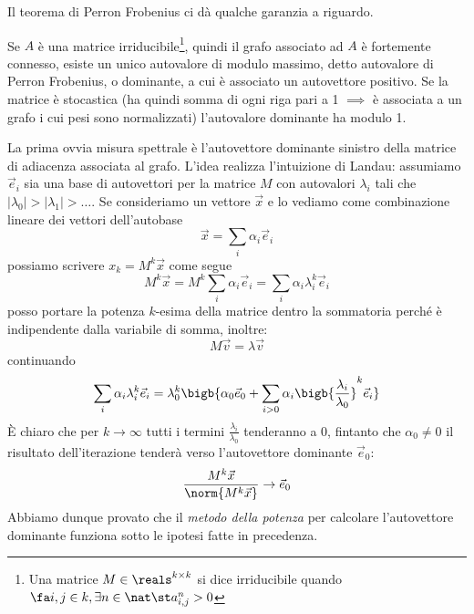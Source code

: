 Il teorema di Perron Frobenius ci dà qualche garanzia a riguardo.
\begin{theorem}
    Se $A$ è una matrice irriducibile\footnote{Una matrice $M \in \reals^{k \times k}$ si dice irriducibile quando $\fa i, j \in k, \exists n \in \nat \st a_{i, j}^n > 0$}, quindi il grafo associato ad $A$ è fortemente connesso, esiste un unico autovalore di modulo massimo, detto autovalore di Perron Frobenius, o dominante, a cui è associato un autovettore positivo. Se la matrice è stocastica (ha quindi somma di ogni riga pari a 1 $\implies$ è associata a un grafo i cui pesi sono normalizzati) l'autovalore dominante ha modulo 1.
\end{theorem}
\noindent La prima ovvia misura spettrale è l'autovettore dominante sinistro della matrice di adiacenza associata al grafo. L'idea realizza l'intuizione di Landau: assumiamo $\vec{e}_i$ sia una base di autovettori per la matrice $M$ con autovalori $\lambda_i$ tali che $|\lambda_0| > |\lambda_1| > \dots$. Se consideriamo un vettore $\vec{x}$ e lo vediamo come combinazione lineare dei vettori dell'autobase
\begin{equation*}
    \vec{x} = \sum_i{\alpha_i\vec{e}_i}
\end{equation*}
possiamo scrivere $x_k = M^k\vec{x}$ come segue
\begin{equation*}
    M^k\vec{x} = M^k\sum_i{\alpha_i\vec{e}_i} = \sum_i{\alpha_i \lambda_i^k \vec{e}_i}
\end{equation*}
posso portare la potenza $k$-esima della matrice dentro la sommatoria perché è indipendente dalla variabile di somma, inoltre:
\begin{equation*}
    M\vec{v} = \lambda \vec{v}
\end{equation*}
continuando
\begin{equation*}
    \sum_i{\alpha_i \lambda_i^k \vec{e}_i} = \lambda_0^k\bigb{\alpha_0\vec{e}_0 + \sum_{i > 0}{\alpha_i\bigb{\frac{\lambda_i}{\lambda_0}}^k\vec{e}_i}}
\end{equation*}
È chiaro che per $k \to \infty$ tutti i termini $\frac{\lambda_i}{\lambda_0}$ tenderanno a 0, fintanto che $\alpha_0 \neq 0$ il risultato dell'iterazione tenderà verso l'autovettore dominante $\vec{e}_0$:
\begin{equation*}
    \frac{M^k\vec{x}}{\norm{M^k\vec{x}}} \to \vec{e}_0
\end{equation*}
Abbiamo dunque provato che il \textit{metodo della potenza} per calcolare l'autovettore dominante funziona sotto le ipotesi fatte in precedenza.

